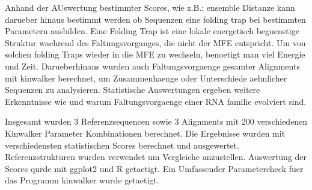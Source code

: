 Anhand der AUswertung bestimmter Scores, wie z.B.: ensemble Distanze kann darueber hinaus bestimmt werden ob Sequenzen eine folding trap bei bestimmten Parametern ausbilden. Eine Folding Trap ist eine lokale energetisch beguenstige Struktur waehrend des Faltungsvorganges, die nicht der MFE entspricht. Um von solchen folding Traps wieder in die MFE zu wechseln, benoetigt man viel Energie und Zeit.
Darueberhinaus wurden auch Faltungsvorgaenge gesamter Alignments mit kinwalker berechnet, um Zusammenhaenge oder Unterschiede aehnlicher Sequenzen zu analysieren. Statistische Auswertungen ergeben weitere Erkenntnisse wie und warum Faltungsvorgaenge einer RNA familie evolviert sind.

Insgesamt wurden 3 Referenzsequencen sowie 3 Alignments mit 200 verschiedenen Kinwalker Parameter Kombinationen berechnet. Die Ergebnisse wurden mit verschiedensten statistischen Scores berechnet und ausgewertet. Referenzstrukturen wurden verwendet um Vergleiche anzustellen. 
Auswertung der Scores qurde mit ggplot2 und R getaetigt.
Ein Umfassender Parametercheck fuer das Programm kinwalker wurde getaetigt.





\endgroup			

\vfill
